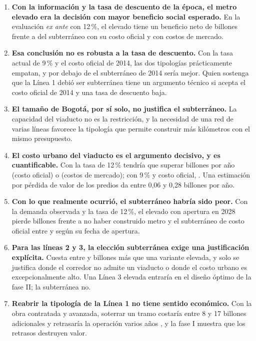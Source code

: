 \begin{enumerate}
\item \textbf{Con la información y la tasa de descuento de la época, el metro elevado era la decisión
      con mayor beneficio social esperado.} En la evaluación \emph{ex ante} con 12\,\%, el elevado
      tiene un beneficio neto de \BNElevDoce{} billones frente a \BNSubOfDoce{} del subterráneo con su
      costo oficial y \BNSubUnDoce{} con costos de mercado.
\item \textbf{Esa conclusión no es robusta a la tasa de descuento.} Con la tasa actual de 9\,\% y el
      costo oficial de 2014, las dos tipologías prácticamente empatan, y por debajo de \TasaEmpate{} el
      subterráneo de 2014 sería mejor. Quien sostenga que la Línea 1 debió ser subterránea tiene un
      argumento técnico si acepta el costo oficial de 2014 y una tasa de descuento baja.
\item \textbf{El tamaño de Bogotá, por sí solo, no justifica el subterráneo.} La capacidad del viaducto
      no es la restricción, y la necesidad de una red de varias líneas favorece la tipología que permite
      construir más kilómetros con el mismo presupuesto.
\item \textbf{El costo urbano del viaducto es el argumento decisivo, y es cuantificable.} Con la tasa de
      12\,\% tendría que superar \UmbralOfDoce{} billones por año (costo oficial) o \UmbralUnDoce{}
      (costos de mercado); con 9\,\% y costo oficial, \UmbralOfNueve. Una estimación por pérdida de
      valor de los predios da entre 0,06 y 0,28 billones por año.
\item \textbf{Con lo que realmente ocurrió, el subterráneo habría sido peor.} Con la demanda observada
      y la tasa de 12\,\%, el elevado con apertura en 2028 pierde \BNExpostElevReal{} billones frente a no
      haber construido metro y el subterráneo de costo oficial entre \BNExpostSubDosMilTreinta{} y
      \BNExpostSubDosMilVeinticuatro{} según su fecha de apertura.
\item \textbf{Para las líneas 2 y 3, la elección subterránea exige una justificación explícita.} Cuesta
      entre \AhorroLdos{} y \AhorroLtres{} billones más que una variante elevada, y solo se justifica
      donde el corredor no admite un viaducto o donde el costo urbano es excepcionalmente alto. Una
      Línea 3 elevada entraría en el diseño óptimo de la fase II; la subterránea no.
\item \textbf{Reabrir la tipología de la Línea 1 no tiene sentido económico.} Con la obra contratada y
      avanzada, soterrar un tramo costaría entre 8 y 17 billones adicionales y retrasaría la operación
      varios años \citep{eltiempo2023,narvaez2023}, y la fase I muestra que los retrasos destruyen
      valor.
\end{enumerate}
